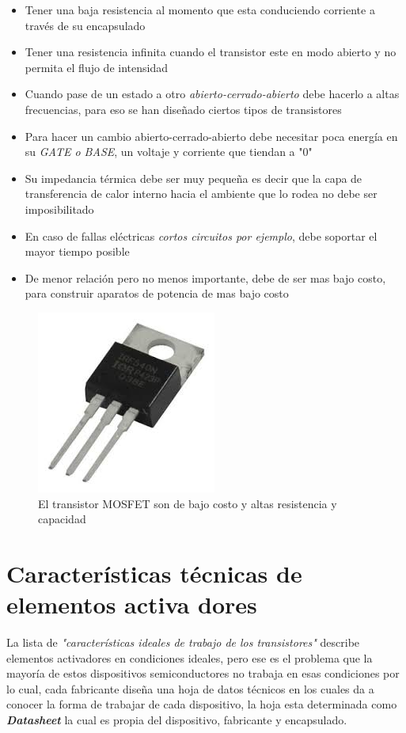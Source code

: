 \documentclass[11pt,a4paper]{article}
\begin{document}
\begin{itemize}
\item Tener una baja resistencia al momento que esta conduciendo corriente a través de su encapsulado
\item Tener una resistencia infinita cuando el transistor este en modo abierto y no permita el flujo de intensidad
\item Cuando pase de un estado a otro \emph{abierto-cerrado-abierto} debe hacerlo a altas frecuencias, para eso se han diseñado ciertos tipos de transistores
\item Para hacer un cambio abierto-cerrado-abierto debe necesitar poca energía en su \emph{GATE o BASE}, un voltaje y corriente que tiendan a "0"
\item Su impedancia térmica debe ser muy pequeña es decir que la capa de transferencia de calor interno hacia el ambiente que lo rodea no debe ser imposibilitado
\item En caso de fallas eléctricas \emph{cortos circuitos por ejemplo}, debe soportar el mayor tiempo posible
\item De menor relación pero no menos importante, debe de ser mas bajo costo, para construir aparatos de potencia de mas bajo costo
\end{itemize}

\begin{figure}[h]
\begin{center}
\includegraphics[scale=0.5]{2.jpeg}
\caption{El transistor MOSFET son de bajo costo y altas resistencia y capacidad}
\end{center}
\end{figure}

\section{Características técnicas de elementos activa dores}

La lista de \emph{"características ideales de trabajo de los transistores"} describe elementos activadores en condiciones ideales, pero ese es el problema que la mayoría de estos dispositivos semiconductores no trabaja en esas condiciones por lo cual, cada fabricante diseña una hoja de datos técnicos en los cuales da a conocer la forma de trabajar de cada dispositivo, la hoja esta determinada como \emph{\textbf{Datasheet}} la cual es propia del dispositivo, fabricante y encapsulado.
\end{document}
